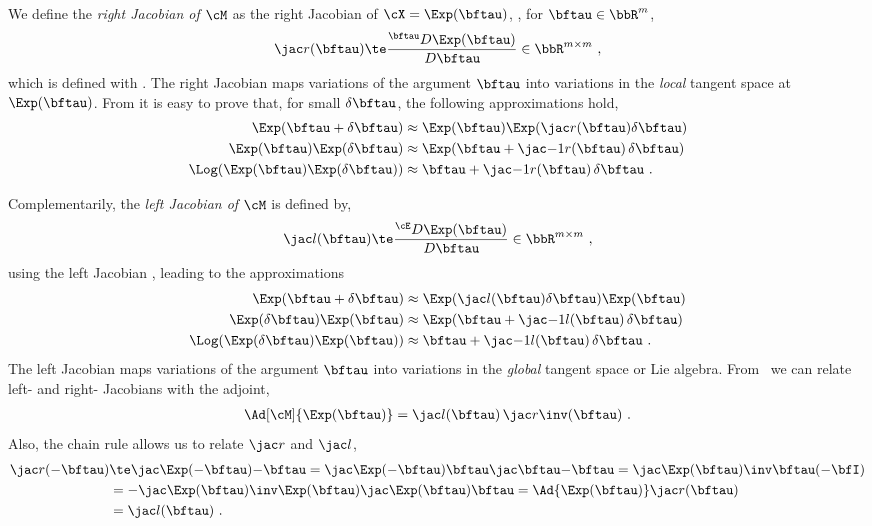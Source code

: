 We define the \emph{right Jacobian of $\cM$} as the right Jacobian of $\cX=\Exp(\bftau)$, \ie, for $\bftau\in
\bbR^m$,
%
\begin{align}
\mjac{}{r}(\bftau) \te \rdpar{\Exp(\bftau)}{\bftau} \in \bbR^{m\times m} 
~,
\label{equ:M_Jr}
\end{align}
%
which is defined with . 
The right Jacobian maps variations of the argument $\bftau$ into variations in the \emph{local} tangent space at $\Exp(\bftau)$. 
From  it is easy to prove that, for small $\delta\bftau$, the following approximations hold,
%
\begin{align}
\Exp(\bftau+\delta\bftau) &\approx \Exp(\bftau)\Exp(\mjac{}{r}(\bftau)\delta\bftau) \label{equ:Jr_1} \\
\Exp(\bftau)\Exp(\delta\bftau) &\approx \Exp(\bftau+\mjac{-1}{r}(\bftau)\,\delta\bftau) \label{equ:Jr_2} \\
\Log(\Exp(\bftau)\Exp(\delta\bftau)) &\approx \bftau+\mjac{-1}{r}(\bftau)\,\delta\bftau \label{equ:Jr_3}
~.
\end{align}
%

Complementarily, the \emph{left Jacobian of $\cM$} is defined by, 
%
\begin{align}
\mjac{}{l}(\bftau) \te \ldpar{\Exp(\bftau)}{\bftau} \in \bbR^{m\times m} 
~,
\label{equ:M_Jl}
\end{align}
%
using the left Jacobian , leading to the approximations
%
\begin{align}
\Exp(\bftau+\delta\bftau) &\approx \Exp(\mjac{}{l}(\bftau)\delta\bftau)\Exp(\bftau) \label{equ:Jl_1}\\
\Exp(\delta\bftau)\Exp(\bftau) &\approx \Exp(\bftau+\mjac{-1}{l}(\bftau)\,\delta\bftau) \label{equ:Jl_2}\\
\Log(\Exp(\delta\bftau)\Exp(\bftau)) &\approx \bftau+\mjac{-1}{l}(\bftau)\,\delta\bftau \label{equ:Jl_3}
~.
\end{align}
% 
The left Jacobian maps variations of the argument $\bftau$ into variations in the \emph{global} tangent space or Lie algebra. 
From~ we can relate left- and right- Jacobians with the adjoint, 
%
\begin{align}\label{equ:Jr_Jl_Adj}
\Ad[\cM]{\Exp(\bftau)} = \mjac{}{l}(\bftau)\,\mjac{}{r}\inv(\bftau)
~.
\end{align}
%
Also, the chain rule allows us to relate $\mjac{}{r}$ and $\mjac{}{l}$, 
%
\begin{align}\label{equ:Jr_minus}
\mjac{}{r}(-\bftau) 
 &\te \mjac{\Exp(-\bftau)}{-\bftau} 
 = \mjac{\Exp(-\bftau)}{\bftau}\mjac{\bftau}{-\bftau} 
 = \mjac{\Exp(\bftau)\inv}{\bftau}(-\bfI) 
 \notag\\
 &
 = -\mjac{\Exp(\bftau)\inv}{\Exp(\bftau)}\mjac{\Exp(\bftau)}{\bftau} 
 = \Ad{\Exp(\bftau)}\mjac{}{r}(\bftau)
 \notag\\
 &
 = \mjac{}{l}(\bftau)
 ~.
\end{align}



